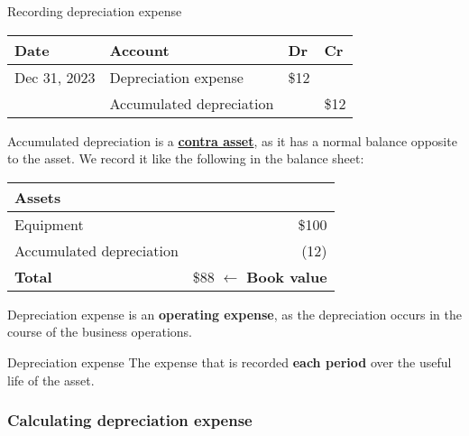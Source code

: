 \begin{knBox}
    {Recording depreciation expense}
    \vspace{1em}
    \begin{tabular}{llll}
        \textbf{Date} & \textbf{Account}               & \textbf{Dr} & \textbf{Cr} \\
        \hline
        Dec 31, 2023  & Depreciation expense           & \$12        &             \\
                      & \quad Accumulated depreciation &             & \$12        \\
    \end{tabular}

    \vspace{1em}

    Accumulated depreciation is a \hyperref[def:contra]{\textbf{contra asset}}, as it has a normal balance opposite to the asset. We record it like the following in the balance sheet:

    \vspace{1em}

    \begin{tabular}{lr}
        \textbf{Assets}                &                                       \\
        \hline
        Equipment                      & \$100                                 \\
        \quad Accumulated depreciation & (12)                                  \\
        \hline
        \textbf{Total}                 & \$88 $\leftarrow$ \textbf{Book value} \\
    \end{tabular}

    Depreciation expense is an \textbf{operating expense}, as the depreciation occurs in the course of the business operations.
\end{knBox}

\begin{knBox}
    {Depreciation expense}
    The expense that is recorded \textbf{each period} over the useful life of the asset.
\end{knBox}

\subsubsection{Calculating depreciation expense}


